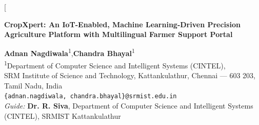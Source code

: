 \documentclass[10pt,twocolumn]{article}
\begin{document}
\twocolumn[{%
\begin{@twocolumnfalse}

\begin{center}
{\Large\bfseries CropXpert: An IoT-Enabled, Machine Learning-Driven Precision\\[4pt]
Agriculture Platform with Multilingual Farmer Support Portal}

\vspace{0.7em}

{\normalsize
\textbf{Adnan Nagdiwala}\textsuperscript{1},\quad \textbf{Chandra Bhayal}\textsuperscript{1}\\[3pt]
\textsuperscript{1}Department of Computer Science and Intelligent Systems (CINTEL),\\
SRM Institute of Science and Technology, Kattankulathur, Chennai --- 603 203, Tamil Nadu, India\\[2pt]
\texttt{\{adnan.nagdiwala, chandra.bhayal\}@srmist.edu.in}\\[3pt]
\textit{Guide:} \textbf{Dr. R. Siva}, Department of Computer Science and Intelligent Systems (CINTEL), SRMIST Kattankulathur
}

\vspace{0.8em}


\end{center}
\end{@twocolumnfalse}}
\end{document}
